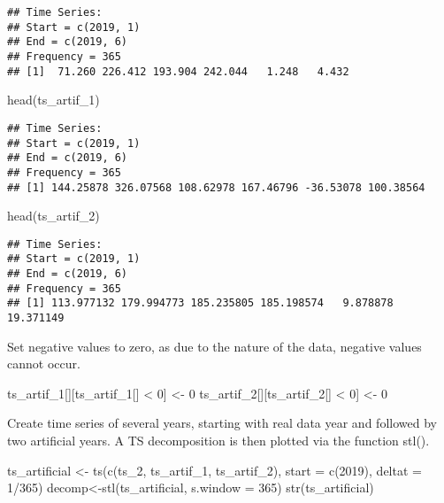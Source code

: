 \documentclass[
]{article}
\newenvironment{Shaded}{\begin{snugshade}}{\end{snugshade}}
\newcommand{\AttributeTok}[1]{\textcolor[rgb]{0.77,0.63,0.00}{#1}}
\newcommand{\DecValTok}[1]{\textcolor[rgb]{0.00,0.00,0.81}{#1}}
\newcommand{\FunctionTok}[1]{\textcolor[rgb]{0.00,0.00,0.00}{#1}}
\newcommand{\NormalTok}[1]{#1}
\newcommand{\OtherTok}[1]{\textcolor[rgb]{0.56,0.35,0.01}{#1}}
\newcommand{\SpecialCharTok}[1]{\textcolor[rgb]{0.00,0.00,0.00}{#1}}
\begin{document}
\begin{verbatim}
## Time Series:
## Start = c(2019, 1) 
## End = c(2019, 6) 
## Frequency = 365 
## [1]  71.260 226.412 193.904 242.044   1.248   4.432
\end{verbatim}

\begin{Shaded}
\begin{Highlighting}[]
\FunctionTok{head}\NormalTok{(ts\_artif\_1)}
\end{Highlighting}
\end{Shaded}

\begin{verbatim}
## Time Series:
## Start = c(2019, 1) 
## End = c(2019, 6) 
## Frequency = 365 
## [1] 144.25878 326.07568 108.62978 167.46796 -36.53078 100.38564
\end{verbatim}

\begin{Shaded}
\begin{Highlighting}[]
\FunctionTok{head}\NormalTok{(ts\_artif\_2)}
\end{Highlighting}
\end{Shaded}

\begin{verbatim}
## Time Series:
## Start = c(2019, 1) 
## End = c(2019, 6) 
## Frequency = 365 
## [1] 113.977132 179.994773 185.235805 185.198574   9.878878  19.371149
\end{verbatim}

Set negative values to zero, as due to the nature of the data, negative
values cannot occur.

\begin{Shaded}
\begin{Highlighting}[]
\NormalTok{ts\_artif\_1[][ts\_artif\_1[] }\SpecialCharTok{\textless{}} \DecValTok{0}\NormalTok{] }\OtherTok{\textless{}{-}} \DecValTok{0}
\NormalTok{ts\_artif\_2[][ts\_artif\_2[] }\SpecialCharTok{\textless{}} \DecValTok{0}\NormalTok{] }\OtherTok{\textless{}{-}} \DecValTok{0}
\end{Highlighting}
\end{Shaded}

Create time series of several years, starting with real data year and
followed by two artificial years. A TS decomposition is then plotted via
the function stl().

\begin{Shaded}
\begin{Highlighting}[]
\NormalTok{ts\_artificial }\OtherTok{\textless{}{-}} \FunctionTok{ts}\NormalTok{(}\FunctionTok{c}\NormalTok{(ts\_2, ts\_artif\_1, ts\_artif\_2), }\AttributeTok{start =} \FunctionTok{c}\NormalTok{(}\DecValTok{2019}\NormalTok{), }\AttributeTok{deltat =} \DecValTok{1}\SpecialCharTok{/}\DecValTok{365}\NormalTok{)}
\NormalTok{decomp}\OtherTok{\textless{}{-}}\FunctionTok{stl}\NormalTok{(ts\_artificial, }\AttributeTok{s.window =} \DecValTok{365}\NormalTok{)}
\FunctionTok{str}\NormalTok{(ts\_artificial)}
\end{Highlighting}
\end{Shaded}
\end{document}
